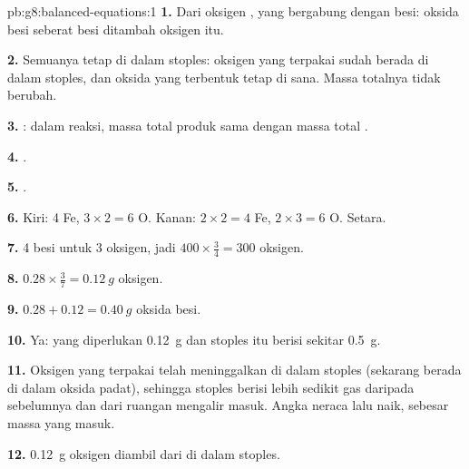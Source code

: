 \begin{solution}{pb:g8:balanced-equations:1}
\textbf{1.} Dari oksigen , yang bergabung dengan besi: oksida besi
seberat besi ditambah oksigen itu.

\textbf{2.} Semuanya tetap di dalam stoples: oksigen yang terpakai sudah
berada di dalam stoples, dan oksida yang terbentuk tetap di sana. Massa
totalnya tidak berubah.

\textbf{3.} : dalam reaksi, massa total produk sama
dengan massa total .

\textbf{4.} .

\textbf{5.} .

\textbf{6.} Kiri: 4 Fe, $3 \times 2 = 6$ O. Kanan: $2 \times 2 = 4$ Fe,
$2 \times 3 = 6$ O. Setara.

\textbf{7.} 4  besi untuk 3  oksigen, jadi $400 \times
\frac{3}{4} = 300$  oksigen.

\textbf{8.} $0.28 \times \frac{3}{7} = \qty{0.12}{g}$ oksigen.

\textbf{9.} $0.28 + 0.12 = \qty{0.40}{g}$ oksida besi.

\textbf{10.} Ya: yang diperlukan \qty{0.12}{g} dan stoples itu berisi
sekitar \qty{0.5}{g}.

\textbf{11.} Oksigen yang terpakai telah meninggalkan  di dalam
stoples (sekarang berada di dalam oksida padat), sehingga stoples berisi
lebih sedikit gas daripada sebelumnya dan  dari ruangan mengalir
masuk. Angka neraca lalu naik, sebesar massa  yang masuk.

\textbf{12.} \qty{0.12}{g} oksigen diambil dari  di dalam stoples.
\end{solution}
